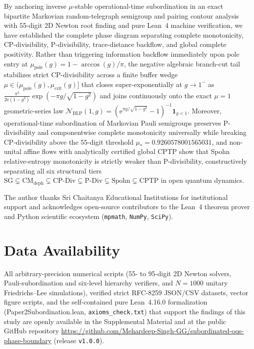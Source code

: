\documentclass[twocolumn,10pt,amsmath,amssymb,floatfix]{revtex4-2}
\theoremstyle{plain}
\theoremstyle{definition}
\newcommand{\ee}{\mathrm{e}}
\newcommand{\NBLP}{\mathcal{N}_{\mathrm{BLP}}}
\newcommand{\mupole}{\mu_{\mathrm{pole}}}
\newcommand{\mucrit}{\mu_{\mathrm{crit}}}
\newcommand{\mustar}{\mu_*}
\newcommand{\leanid}[1]{{\footnotesize\ttfamily\def\_{\textunderscore\penalty0\hspace{0pt}}#1}}
\begin{document}
By anchoring inverse $\mu$-stable operational-time subordination in an exact bipartite Markovian random-telegraph semigroup and pairing contour analysis with 55-digit 2D Newton root finding and pure Lean~4 machine verification, we have established the complete phase diagram separating complete monotonicity, CP-divisibility, P-divisibility, trace-distance backflow, and global complete positivity. Rather than triggering information backflow immediately upon pole entry at $\mupole(g) = 1 - \arccos(g)/\pi$, the negative algebraic branch-cut tail stabilizes strict CP-divisibility across a finite buffer wedge $\mu \in (\mupole(g), \mucrit(g)]$ that closes super-exponentially at $g \to 1^-$ as $\frac{\pi^2}{2\ee(1-g^2)}\exp(-\pi g/\sqrt{1-g^2})$ and joins continuously onto the exact $\mu=1$ geometric-series law $\NBLP(1,g) = (\ee^{\pi g/\sqrt{1-g^2}}-1)^{-1}\mathbf{1}_{g<1}$. Moreover, operational-time subordination of Markovian Pauli semigroups preserves P-divisibility and componentwise complete monotonicity universally while breaking CP-divisibility above the 55-digit threshold $\mustar = 0.9260578001565031$, and non-unital affine flows with analytically certified global CPTP show that Spohn relative-entropy monotonicity is strictly weaker than P-divisibility, constructively separating all six structural tiers $\mathrm{SG} \subsetneq \mathrm{CM}_{\mathrm{deph}} \subsetneq \mathrm{CP\text{-}Div} \subsetneq \mathrm{P\text{-}Div} \subsetneq \mathrm{Spohn} \subsetneq \mathrm{CPTP}$ in open quantum dynamics.

\begin{acknowledgments}
The author thanks Sri Chaitanya Educational Institutions for institutional support and acknowledges open-source contributors to the Lean~4 theorem prover and Python scientific ecosystem (\texttt{mpmath}, \texttt{NumPy}, \texttt{SciPy}).
\end{acknowledgments}

\section*{Data Availability}
{\def\UrlBreaks{\do\/\do-}%
All arbitrary-precision numerical scripts (55- to 95-digit 2D Newton solvers, Pauli-subordination and six-level hierarchy verifiers, and $N=1000$ unitary Friedrichs--Lee simulations), verified strict RFC-8259 JSON/CSV datasets, vector figure scripts, and the self-contained pure Lean~4.16.0 formalization (\leanid{Paper2\_Subordination.lean}, \texttt{axioms\_check.txt}) that support the findings of this study are openly available in the Supplemental Material and at the public GitHub repository \url{https://github.com/Mehardeep-Singh-GG/subordinated-oqs-phase-boundary} (release \texttt{v1.0.0}).%
}
\end{document}
